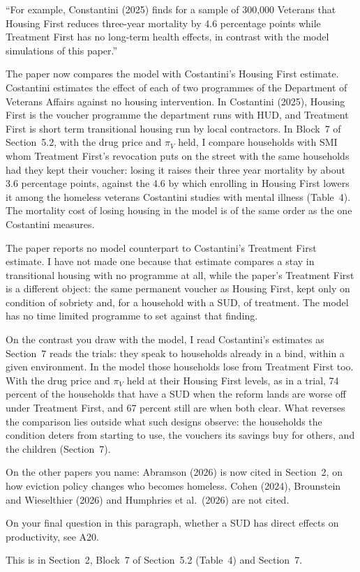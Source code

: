 \documentclass[11pt]{article}
\begin{document}
\begin{referee}
``For example, Constantini (2025) finds for a sample of 300,000 Veterans that
Housing First reduces three-year mortality by 4.6 percentage points while
Treatment First has no long-term health effects, in contrast with the model
simulations of this paper.''
\end{referee}
\begin{response}
\newresult The paper now compares the model with Costantini's Housing First
estimate. Costantini estimates the effect of each of two programmes of the
Department of Veterans Affairs against no housing intervention. In Costantini (2025), Housing First is the voucher programme the department runs with HUD, and Treatment First is
short term transitional housing run by local contractors. In Block~7 of
Section~5.2, with the drug price and $\pi_V$ held, I compare households with SMI
whom Treatment First's revocation puts on the street with the same households had
they kept their voucher: losing it raises their three year mortality by about 3.6
percentage points, against the 4.6 by which enrolling in Housing First lowers it
among the homeless veterans Costantini studies with mental illness (Table~4). The mortality cost of
losing housing in the model is of the same order as the one Costantini measures.

\open The paper reports no model counterpart to Costantini's Treatment First estimate. I
have not made one because that estimate compares a stay in transitional housing with
no programme at all, while the paper's Treatment First is a different object: the
same permanent voucher as Housing First, kept only on condition of sobriety and,
for a household with a SUD, of treatment. The model has no time limited programme
to set against that finding.

On the contrast you draw with the model, I read Costantini's estimates as Section~7 reads
the trials: they speak to households already in a bind, within a given
environment. In the model those households lose from Treatment First too. With the
drug price and $\pi_V$ held at their Housing First levels, as in a trial, 74 percent
of the households that have a SUD when the reform lands are worse off under
Treatment First, and 67 percent still are when both clear. What reverses the
comparison lies outside what such designs observe: the households the condition
deters from starting to use, the vouchers its savings buy for others, and the
children (Section~7).

On the other papers you name: Abramson (2026) is now cited in Section~2, on how
eviction policy changes who becomes homeless. \open Cohen (2024), Brounstein and
Wieselthier (2026) and Humphries et al.\ (2026) are not cited.

On your final question in this paragraph, whether a SUD has direct effects on
productivity, see A20.

This is in Section~2, Block~7 of Section~5.2 (Table~4) and Section~7.
\end{response}
\end{document}
